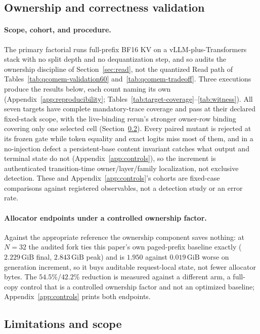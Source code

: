 \documentclass{article}
\newcommand{\gib}{\,\mathrm{GiB}}
\begin{document}
\subsection{Ownership and correctness validation}
\label{sec:correctness}
\label{sec:results}

\paragraph{Scope, cohort, and procedure.} \label{sec:target-status} The primary
factorial runs full-prefix BF16 KV on a vLLM-plus-Transformers stack with no
split depth and no dequantization step, and so audits the ownership discipline
of Section~\ref{sec:read}, not the quantized Read path of
Tables~\ref{tab:qcomem-validation60} and~\ref{tab:qcomem-tradeoff}.  Three executions produce the results below, each count naming its own
(Appendix~\ref{app:reproducibility};
Tables~\ref{tab:target-coverage}--\ref{tab:witness}).  All seven targets have
complete mandatory-trace coverage and pass at their declared fixed-stack scope,
with the live-binding rerun's stronger owner-row binding covering only one
selected cell (Section~\ref{sec:limitations}).  Every paired mutant is rejected
at its frozen gate while token equality and exact logits miss most of them, and
in a no-injection defect a persistent-base content invariant catches what output
and terminal state do not (Appendix~\ref{app:controls}), so the increment is
authenticated transition-time owner/layer/family localization, not exclusive
detection.  These and Appendix~\ref{app:controls}'s cohorts are fixed-case
comparisons against registered observables, not a detection study or an error
rate.

\paragraph{Allocator endpoints under a controlled ownership factor.}
Against the appropriate reference the ownership component saves nothing: at
$N=32$ the audited fork ties this paper's own paged-prefix baseline exactly
($2.229\gib$ final, $2.843\gib$ peak) and is $1.950$ against $0.019\gib$ worse
on generation increment, so it buys auditable request-local state, not fewer
allocator bytes.  The $54.5\%$/$42.2\%$ reduction is measured against a
different arm, a full-copy control that is a controlled ownership factor and not
an optimized baseline; Appendix~\ref{app:controls} prints both endpoints.

\subsection{Limitations and scope}
\label{sec:limitations}
\end{document}
